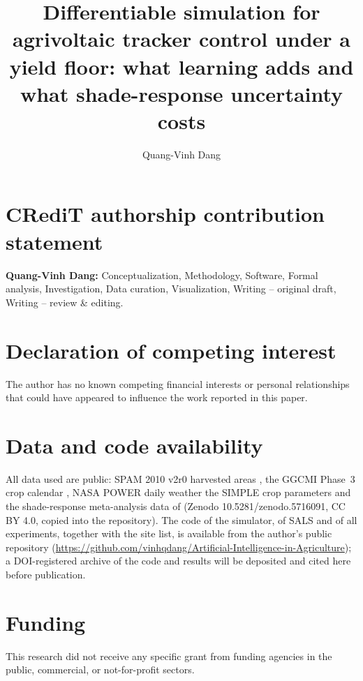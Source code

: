 \documentclass[preprint,12pt,authoryear]{elsarticle}
\begin{document}
\begin{frontmatter}

\title{Differentiable simulation for agrivoltaic tracker control under a yield floor: what learning adds and what shade-response uncertainty costs}

\author{Quang-Vinh Dang}
\address{British University Vietnam, Hung Yen, Vietnam}



\end{frontmatter}







\section*{CRediT authorship contribution statement}
\textbf{Quang-Vinh Dang:} Conceptualization, Methodology, Software, Formal analysis, Investigation, Data curation, Visualization, Writing -- original draft, Writing -- review \& editing.

\section*{Declaration of competing interest}
The author has no known competing financial interests or personal relationships that could have appeared to influence the work reported in this paper.

\section*{Data and code availability}
All data used are public: SPAM 2010 v2r0 harvested areas \citep{yu2020}, the GGCMI Phase~3 crop calendar \citep{jagermeyr2021}, NASA POWER daily weather \citep{sparks2018} the SIMPLE crop parameters \citep{zhao2019} and the shade-response meta-analysis data of \citet{laub2022} (Zenodo 10.5281/zenodo.5716091, CC BY 4.0, copied into the repository). The code of the simulator, of SALS and of all experiments, together with the site list, is available from the author's public repository (\url{https://github.com/vinhqdang/Artificial-Intelligence-in-Agriculture}); a DOI-registered archive of the code and results will be deposited and cited here before publication.

\section*{Funding}
This research did not receive any specific grant from funding agencies in the public, commercial, or not-for-profit sectors.



\end{document}
